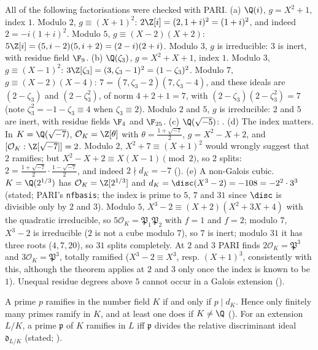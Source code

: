 \begin{example}\label{ex:ant:dkexamples}
All of the following factorisations were checked with PARI.
(a) $\Q(i)$, $g=X^2+1$, index $1$. Modulo $2$, $g\equiv(X+1)^2$: $2\Z[i]=(2,1+i)^2=(1+i)^2$, and indeed $2=-i(1+i)^2$. Modulo $5$, $g\equiv(X-2)(X+2)$:
$5\Z[i]=(5,i-2)(5,i+2)=(2-i)(2+i)$. Modulo $3$, $g$ is irreducible: $3$ is inert, with residue field $\F_9$.
(b) $\Q(\zeta_3)$, $g=X^2+X+1$, index $1$. Modulo $3$, $g\equiv(X-1)^2$: $3\Z[\zeta_3]=(3,\zeta_3-1)^2=(1-\zeta_3)^2$. Modulo $7$, $g\equiv(X-2)(X-4)$:
$7=(7,\zeta_3-2)(7,\zeta_3-4)$, and these ideals are $(2-\zeta_3)$ and $(2-\zeta_3^2)$, of norm $4+2+1=7$, with $(2-\zeta_3)(2-\zeta_3^2)=7$ (note
$\zeta_3^2=-1-\zeta_3\equiv4$ when $\zeta_3\equiv2$). Modulo $2$ and $5$, $g$ is irreducible: $2$ and $5$ are inert, with residue fields $\F_4$ and $\F_{25}$.
(c) $\Q(\sqrt{-5})$: .
(d) The index matters. In $K=\Q(\sqrt{-7})$, $\mathcal O_K=\Z[\theta]$ with $\theta=\frac{1+\sqrt{-7}}2$, $g=X^2-X+2$, and $[\mathcal O_K:\Z[\sqrt{-7}]]=2$. Modulo $2$,
$X^2+7\equiv(X+1)^2$ would wrongly suggest that $2$ ramifies; but $X^2-X+2\equiv X(X-1)\pmod2$, so $2$ splits:
$2=\frac{1+\sqrt{-7}}2\cdot\frac{1-\sqrt{-7}}2$, and indeed $2\nmid d_K=-7$ ().
(e) A non-Galois cubic. $K=\Q(2^{1/3})$ has $\mathcal O_K=\Z[2^{1/3}]$ and $d_K=\disc(X^3-2)=-108=-2^2\cdot3^3$ (stated; PARI's \texttt{nfbasis}; the
index is prime to $5$, $7$ and $31$ since $\disc$ is divisible only by $2$ and $3$). Modulo $5$, $X^3-2\equiv(X+2)(X^2+3X+4)$ with the quadratic
irreducible, so $5\mathcal O_K=\mathfrak P_1\mathfrak P_2$ with $f=1$ and $f=2$; modulo $7$, $X^3-2$ is irreducible ($2$ is not a cube modulo $7$), so $7$ is
inert; modulo $31$ it has three roots ($4,7,20$), so $31$ splits completely. At $2$ and $3$ PARI finds $2\mathcal O_K=\mathfrak P^3$ and $3\mathcal O_K=\mathfrak P^3$,
totally ramified ($X^3-2\equiv X^3$, resp. $(X+1)^3$, consistently with this, although the theorem applies at $2$ and $3$ only once the index is
known to be $1$). Unequal residue degrees above $5$ cannot occur in a Galois extension ().
\end{example}

\begin{theorem}\label{thm:ant:discram}
A prime $p$ ramifies in the number field $K$ if and only if $p\mid d_K$. Hence only finitely many primes ramify in $K$, and at least one does if
$K\ne\Q$ (). For an extension $L/K$, a prime $\mathfrak p$ of $K$ ramifies in $L$ iff $\mathfrak p$ divides the relative
discriminant ideal $\mathfrak d_{L/K}$ (stated; \cite[Chapter III, Section 2]{Neukirch}).
\end{theorem}

